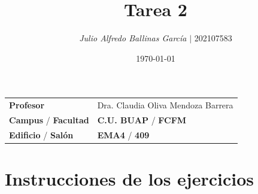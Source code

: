 \documentclass{article}
\title{Tarea 2}
\author{\emph{Julio Alfredo Ballinas García} $\boldsymbol{\mid}$ 202107583}
\date{\today}
\begin{document}
\maketitle



\begin{mybox}
\noindent\begin{tabular}{@{}ll}
	{\bfseries{Profesor}} & Dra. Claudia Oliva Mendoza Barrera\\
	\textcolor{prussianblue}{\bfseries{Campus}} / \textcolor{trueblue}{\bfseries{Facultad}}  & \textcolor{prussianblue}{\bfseries{C.U. BUAP}} /  \textcolor{trueblue}{\bfseries{FCFM}} \\
	\textcolor{prussianblue}{\bfseries{Edificio}} /  \textcolor{trueblue}{\bfseries{Salón}}    & 	\textcolor{prussianblue}{\bfseries{EMA4}} /  \textcolor{trueblue}{\bfseries{409}}   
\end{tabular} 
\end{mybox} \vspace{1cm}

\section{Instrucciones de los ejercicios}
\end{document}
